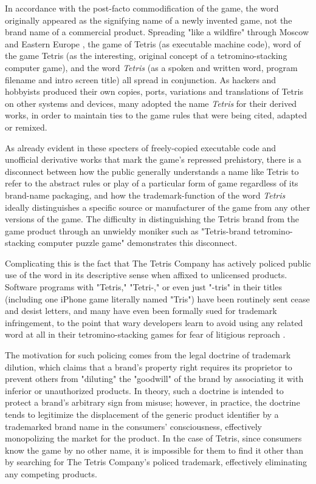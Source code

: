 In accordance with the post-facto commodification of the game, the word originally appeared as the signifying name of a newly invented game, not the brand name of a commercial product. Spreading "like a wildfire" through Moscow and Eastern Europe \autocite[301]{Sheff1993}, the game of Tetris (as executable machine code), word of the game Tetris (as the interesting, original concept of a tetromino-stacking computer game), and the word \emph{Tetris} (as a spoken and written word, program filename and intro screen title) all spread in conjunction. As hackers and hobbyists produced their own copies, ports, variations and translations of Tetris on other systems and devices, many adopted the name \emph{Tetris} for their derived works, in order to maintain ties to the game rules that were being cited, adapted or remixed.

As already evident in these specters of freely-copied executable code and unofficial derivative works that mark the game's repressed prehistory, there is a disconnect between how the public generally understands a name like Tetris to refer to the abstract rules or play of a particular form of game regardless of its brand-name packaging, and how the trademark-function of the word \emph{Tetris} ideally distinguishes a specific source or manufacturer of the game from any other versions of the game. The difficulty in distinguishing the Tetris brand from the game product through an unwieldy moniker such as "Tetris-brand tetromino-stacking computer puzzle game" demonstrates this disconnect.

Complicating this is the fact that The Tetris Company has actively policed public use of the word in its descriptive sense when affixed to unlicensed products. Software programs with "Tetris," "Tetri-," or even just "-tris" in their titles (including one iPhone game literally named "Tris") have been routinely sent cease and desist letters, and many have even been formally sued for trademark infringement, to the point that wary developers learn to avoid using any related word at all in their tetromino-stacking games for fear of litigious reproach \autocites[see][]{DeMocker1998}{Witherspoon2008}.

The motivation for such policing comes from the legal doctrine of trademark dilution, which claims that a brand's property right requires its proprietor to prevent others from "diluting" the "goodwill" of the brand by associating it with inferior or unauthorized products. In theory, such a doctrine is intended to protect a brand's arbitrary sign from misuse; however, in practice, the doctrine tends to legitimize the displacement of the generic product identifier by a trademarked brand name in the consumers' consciousness, effectively monopolizing the market for the product. In the case of Tetris, since consumers know the game by no other name, it is impossible for them to find it other than by searching for The Tetris Company's policed trademark, effectively eliminating any competing products.

